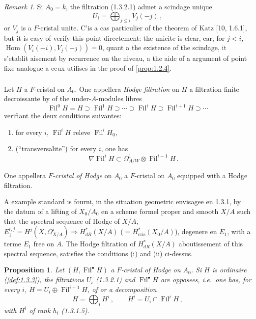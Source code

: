 \documentclass[12pt,a4paper]{article}
\theoremstyle{plain}
\newtheorem{proposition}[theorem]{Proposition}
\theoremstyle{definition}
\theoremstyle{remark}
\newtheorem{remark}[theorem]{Remark}
\DeclareMathOperator{\Hom}{Hom}
\DeclareMathOperator{\Fil}{Fil}
\newcommand{\crys}{\mathrm{cris}}
\begin{document}
\begin{remark}\label{rem:1.3.4}
Si $A_0 = k$, the filtration (1.3.2.1) admet a scindage unique
\begin{equation}\label{eq:1.3.4.1}
U_i = \bigoplus_{j \leq i} V_j(-j)\,,
\end{equation}
or $V_j$ is a $F$-cristal unite. C'is a cas particulier of the theorem of Katz [10, 1.6.1], but it is easy of verify this point directement: the unicite is clear, car, for $j < i$, $\Hom(V_i(-i), V_j(-j)) = 0$, quant a the existence of the scindage, it s'etablit aisement by recurrence on the niveau, a the aide of a argument of point fixe analogue a ceux utilises in the proof of \ref{prop:1.2.4}.
\end{remark}

\subsubsection{}

Let $H$ a $F$-cristal on $A_0$. One appellera \emph{Hodge filtration} on $H$ a filtration finite decroissante by of the under-$A$-modules libres
\[
\Fil^0H = H \supset \Fil^1H \supset \cdots \supset \Fil^iH \supset \Fil^{i+1}H \supset \cdots
\]
verifiant the deux conditions suivantes:
\begin{enumerate}[label=(\roman*)]
\item for every $i$, $\Fil^iH$ releve $\Fil^iH_0$,
\item (``transversalite'') for every $i$, one has
\begin{equation}\label{eq:1.3.5.1}
\nabla\Fil^iH \subset \Omega^1_{A/W} \otimes \Fil^{i-1}H\,.\end{equation}
\end{enumerate}

One appellera \emph{$F$-cristal of Hodge} on $A_0$ a $F$-cristal on $A_0$ equipped with a Hodge filtration.

A example standard is fourni, in the situation geometric envisagee en 1.3.1, by the datum of a lifting of $X_0/A_0$ en a scheme formel proper and smooth $X/A$ such that the spectral sequence of Hodge of $X/A$, $E_1^{i,j} = H^j(X, \Omega_{X/A}^i) \Rightarrow H_{dR}^*(X/A)$ ($= H_{\crys}^*(X_0/A)$), degenere en $E_1$, with a terme $E_1$ free on $A$. The Hodge filtration of $H_{dR}^*(X/A)$ aboutissement of this spectral sequence, satisfies the conditions (i) and (ii) ci-dessus.

\begin{proposition}\label{prop:1.3.6}
Let $(H, \Fil^\bullet H)$ a $F$-cristal of Hodge on $A_0$. Si $H$ is ordinaire (\ref{def:1.3.3}), the filtrations $U_i$ (1.3.2.1) and $\Fil^\bullet H$ are opposees, i.e.\ one has, for every $i$, $H = U_i \oplus \Fil^{i+1}H$, of or a decomposition
\begin{equation}\label{eq:1.3.6.1}
H = \bigoplus_i H^i\,, \qquad H^i = U_i \cap \Fil^iH\,,
\end{equation}
with $H^i$ of rank $h_i$ (1.3.1.5).
\end{proposition}
\end{document}
